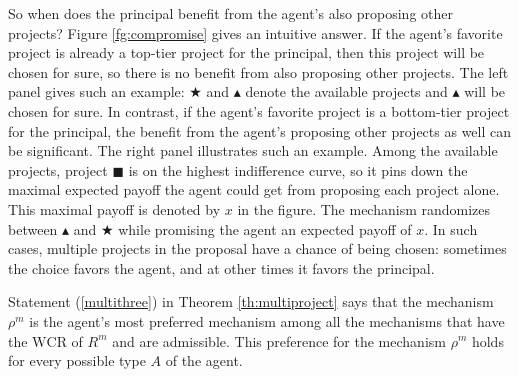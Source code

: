 \documentclass[12pt,english]{article}
\theoremstyle{remark}
\theoremstyle{plain}
\theoremstyle{definition}
\newcommand{\wcr}{\mathrm{WCR}}
\begin{document}
So when does the principal benefit from the agent's also proposing other projects? Figure \ref{fg:compromise} gives an intuitive answer. If the agent's favorite project is already a top-tier project for the principal, then this project will be chosen for sure, so there is no benefit from also proposing other projects. The left panel gives such an example: $\bigstar$ and $\blacktriangle$ denote the available projects and $\blacktriangle$ will be chosen for sure. In contrast, if the agent's favorite project is a bottom-tier project for the principal, the benefit from the agent's proposing other projects as well can be significant. The right panel illustrates such an example. Among the available projects, project $\blacksquare$ is on the highest indifference curve, so it pins down the maximal expected payoff the agent could get from proposing each project alone. This maximal payoff is denoted by $x$ in the figure. The mechanism randomizes between $\blacktriangle$ and $\bigstar$ while promising the agent an expected payoff of $x$. In such cases, multiple projects in the proposal have a chance of being chosen: sometimes the choice favors the agent, and at other times it favors the principal.





 

  



Statement (\ref{multithree}) in Theorem \ref{th:multiproject} says that the mechanism $\rho^m$ is the agent's most preferred mechanism among all the mechanisms that have the $\wcr$ of $R^m$ and are admissible. This preference for the mechanism $\rho^m$ holds for every possible type $A$ of the agent. 
\end{document}
